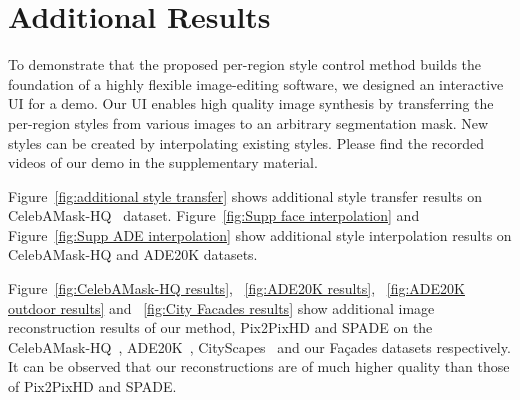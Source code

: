 \documentclass[10pt,twocolumn,letterpaper]{article}
\def\Facades{Fa\c{c}ades\xspace}
\begin{document}
\section{Additional Results}

To demonstrate that the proposed per-region style control method builds the foundation of a highly flexible image-editing software, we designed an interactive UI for a demo.
Our UI enables high quality image synthesis by transferring the per-region styles from various images to an arbitrary segmentation mask.
New styles can be created by interpolating existing styles.
Please find the recorded videos of our demo in the supplementary material.


Figure~\ref{fig:additional style transfer} shows additional style transfer results on CelebAMask-HQ~\cite{CelebAMask-HQ,karras2017progressive,liu2015faceattributes} dataset. Figure~\ref{fig:Supp face interpolation} and Figure~\ref{fig:Supp ADE interpolation} show additional style interpolation results on CelebAMask-HQ and ADE20K datasets.

Figure~\ref{fig:CelebAMask-HQ results}, ~\ref{fig:ADE20K results}, ~\ref{fig:ADE20K outdoor results} and ~\ref{fig:City Facades results} show additional image reconstruction results of our method, Pix2PixHD and SPADE on the CelebAMask-HQ~\cite{CelebAMask-HQ,karras2017progressive,liu2015faceattributes}, ADE20K~\cite{zhou2017scene}, CityScapes~\cite{Cordts2016Cityscapes} and our \Facades datasets respectively.
It can be observed that our reconstructions are of much higher quality than those of Pix2PixHD and SPADE.
\end{document}
